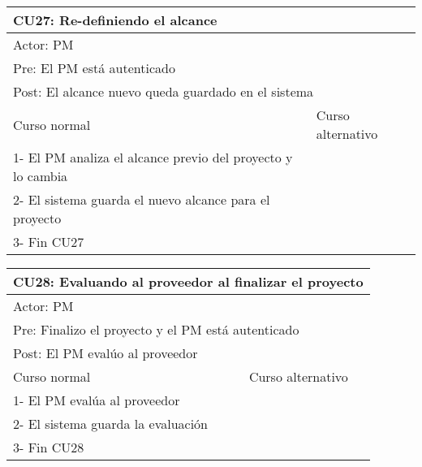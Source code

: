 \begin{table}[H]
  \begin{adjustbox}{max width = \textwidth}
  \begin{tabular}{|l|l|}
    \hline
    \multicolumn{2}{|l|}{CU27: Re-definiendo el alcance} \\\hline
    \multicolumn{2}{|l|}{Actor: PM} \\\hline
    \multicolumn{2}{|l|}{Pre:  El PM está autenticado} \\\hline
    \multicolumn{2}{|l|}{Post: El alcance nuevo queda guardado en el sistema} \\\hline
     Curso normal & Curso alternativo\\ \hline
     1- El PM analiza el alcance previo del proyecto y lo cambia & \\ \hline
  	 2- El sistema guarda el nuevo alcance para el proyecto & \\ \hline
     3- Fin CU27 & \\ \hline
 \end{tabular}
  \end{adjustbox}
\end{table}

\begin{table}[H]
  \begin{adjustbox}{max width = \textwidth}
  \begin{tabular}{|l|l|}
    \hline
    \multicolumn{2}{|l|}{CU28: Evaluando al proveedor al finalizar el proyecto} \\\hline
    \multicolumn{2}{|l|}{Actor: PM} \\\hline
    \multicolumn{2}{|l|}{Pre: Finalizo el proyecto y el PM está autenticado} \\\hline
    \multicolumn{2}{|l|}{Post: El PM evalúo al proveedor} \\\hline
     Curso normal & Curso alternativo\\ \hline
	 1- El PM evalúa al proveedor & \\ \hline
	 2- El sistema guarda la evaluación & \\ \hline
   3- Fin CU28 & \\ \hline
  \end{tabular}
  \end{adjustbox}
\end{table}

